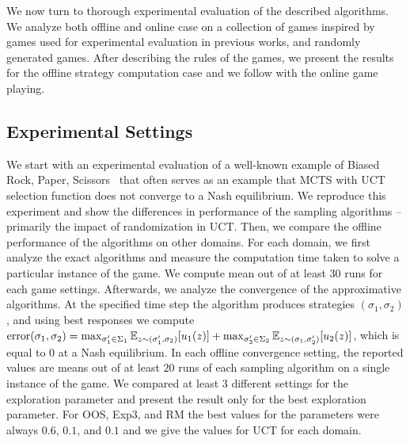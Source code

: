 
We now turn to thorough experimental evaluation of the described algorithms.
We analyze both offline and online case on a collection of games inspired by games used for experimental evaluation in previous works, and randomly generated games.
After describing the rules of the games, we present the results for the offline strategy computation case and we follow with the online game playing.

\subsection{Experimental Settings}


We start with an experimental evaluation of a well-known example of Biased Rock, Paper, Scissors~\cite{Shafiei09} that often serves
as an example that MCTS with UCT selection function does not converge to a Nash equilibrium.
We reproduce this experiment and show the differences in performance of the sampling algorithms -- primarily the impact of randomization in UCT.
Then, we compare the offline performance of the algorithms on other domains.
For each domain, we first analyze the exact algorithms and measure the computation time taken to solve a particular instance of the game. 
We compute mean out of at least $30$ runs for each game settings. 
Afterwards, we analyze the convergence of the approximative algorithms.
At the specified time step the algorithm produces strategies $(\sigma_1,\sigma_2)$, and using best responses we compute 
$\textrm{error}(\sigma_1,\sigma_2) = \max_{\sigma_1' \in \Sigma_1} \mathbb{E}_{z \sim (\sigma_1',\sigma_2)}[u_1(z)] 
                                   + \max_{\sigma_2' \in \Sigma_2} \mathbb{E}_{z \sim (\sigma_1,\sigma_2')}[u_2(z)]$, 
which is equal to $0$ at a Nash equilibrium.
In each offline convergence setting, the reported values are means out of at least $20$ runs of each sampling algorithm on a single instance of the game.
We compared at least $3$ different settings for the exploration parameter and present the result only for the best exploration parameter.
For OOS, Exp3, and RM the best values for the parameters were always $0.6$, $0.1$, and $0.1$ and we give the values for UCT for each domain.

